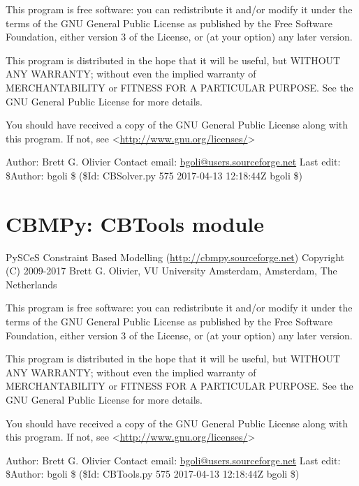 \documentclass[a4paper,11pt,english]{sphinxmanual}
\begin{document}
This program is free software: you can redistribute it and/or modify
it under the terms of the GNU General Public License as published by
the Free Software Foundation, either version 3 of the License, or
(at your option) any later version.

This program is distributed in the hope that it will be useful,
but WITHOUT ANY WARRANTY; without even the implied warranty of
MERCHANTABILITY or FITNESS FOR A PARTICULAR PURPOSE.  See the
GNU General Public License for more details.

You should have received a copy of the GNU General Public License
along with this program.  If not, see \textless{}\url{http://www.gnu.org/licenses/}\textgreater{}

Author: Brett G. Olivier
Contact email: \href{mailto:bgoli@users.sourceforge.net}{bgoli@users.sourceforge.net}
Last edit: \$Author: bgoli \$ (\$Id: CBSolver.py 575 2017-04-13 12:18:44Z bgoli \$)
\label{modules_doc:module-cbmpy.CBTools}

\section{CBMPy: CBTools module}
\label{modules_doc:cbmpy-cbtools-module}
PySCeS Constraint Based Modelling (\url{http://cbmpy.sourceforge.net})
Copyright (C) 2009-2017 Brett G. Olivier, VU University Amsterdam, Amsterdam, The Netherlands

This program is free software: you can redistribute it and/or modify
it under the terms of the GNU General Public License as published by
the Free Software Foundation, either version 3 of the License, or
(at your option) any later version.

This program is distributed in the hope that it will be useful,
but WITHOUT ANY WARRANTY; without even the implied warranty of
MERCHANTABILITY or FITNESS FOR A PARTICULAR PURPOSE.  See the
GNU General Public License for more details.

You should have received a copy of the GNU General Public License
along with this program.  If not, see \textless{}\url{http://www.gnu.org/licenses/}\textgreater{}

Author: Brett G. Olivier
Contact email: \href{mailto:bgoli@users.sourceforge.net}{bgoli@users.sourceforge.net}
Last edit: \$Author: bgoli \$ (\$Id: CBTools.py 575 2017-04-13 12:18:44Z bgoli \$)
\end{document}
